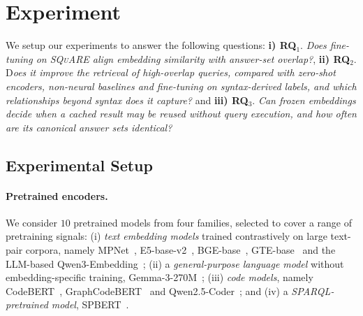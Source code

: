 \documentclass[runningheads]{llncs}
\newcommand{\squareds}{\textsc{SQuARE}}
\begin{document}
\section{Experiment}
\label{sec:exp}

We setup our experiments to answer the following questions: \textbf{i) RQ}$_1$.\textit{ Does fine-tuning on \squareds{} align embedding similarity with answer-set overlap?}, \textbf{ii) RQ}$_2$. D\textit{oes it improve the retrieval of high-overlap queries, compared with zero-shot encoders, non-neural baselines and fine-tuning on syntax-derived labels, and which relationships beyond syntax does it capture?} and \textbf{iii) RQ}$_3$. \textit{Can frozen embeddings decide when a cached result may be reused without query execution, and how often are its canonical answer sets identical?}

\subsection{Experimental Setup}
\label{sec:setup}

\paragraph{Pretrained encoders.}
We consider $10$ pretrained models from four families, selected to cover a
range of pretraining signals:
(i) \emph{text embedding models} trained contrastively on large text-pair
corpora, namely MPNet~\cite{song2020mpnet}, E5-base-v2~\cite{wang2022e5},
BGE-base~\cite{xiao2024bge}, GTE-base~\cite{li2023gte} and the LLM-based
Qwen3-Embedding~\cite{zhang2025qwen3emb};
(ii) a \emph{general-purpose language model} without embedding-specific
training, Gemma-3-270M~\cite{gemmateam2025gemma3};
(iii) \emph{code models}, namely CodeBERT~\cite{feng2020codebert},
GraphCodeBERT~\cite{guo2021graphcodebert} and
Qwen2.5-Coder~\cite{hui2024qwen25coder}; and
(iv) a \emph{SPARQL-pretrained model}, SPBERT~\cite{tran2021spbert}.
\end{document}
